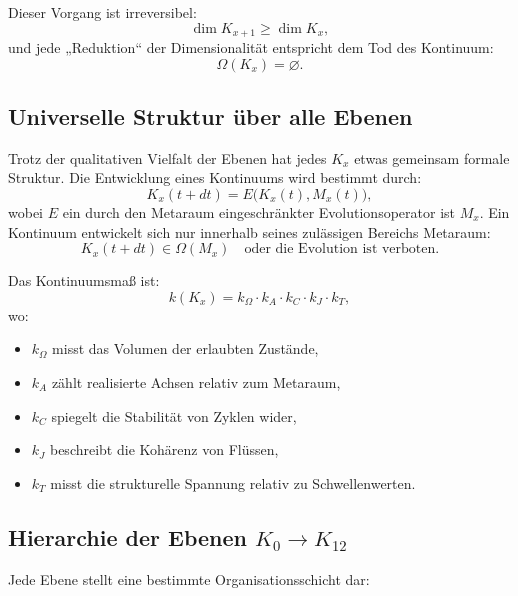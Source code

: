 Dieser Vorgang ist irreversibel:
\[
\dim K_{x+1} \ge \dim K_x,
\]
und jede „Reduktion“ der Dimensionalität entspricht dem Tod des
Kontinuum:
\[
\Omega(K_x) = \varnothing.
\]


\subsection{Universelle Struktur über alle Ebenen}

Trotz der qualitativen Vielfalt der Ebenen hat jedes $K_x$ etwas gemeinsam
formale Struktur.
Die Entwicklung eines Kontinuums wird bestimmt durch:
\[
K_x(t + dt) = E\bigl(K_x(t), M_x(t)\bigr),
\]
wobei $E$ ein durch den Metaraum eingeschränkter Evolutionsoperator ist
$M_x$.
Ein Kontinuum entwickelt sich nur innerhalb seines zulässigen Bereichs
Metaraum:
\[
K_x(t+dt) \in \Omega(M_x)
\quad\text{oder die Evolution ist verboten}.
\]

Das Kontinuumsmaß ist:
\[
k(K_x) =
k_{\Omega} \cdot k_{A} \cdot k_{C} \cdot k_{J} \cdot k_{T},
\]
wo:
\begin{itemize}
    \item $k_{\Omega}$ misst das Volumen der erlaubten Zustände,
    \item $k_{A}$ zählt realisierte Achsen relativ zum Metaraum,
    \item $k_{C}$ spiegelt die Stabilität von Zyklen wider,
    \item $k_{J}$ beschreibt die Kohärenz von Flüssen,
    \item $k_{T}$ misst die strukturelle Spannung relativ zu Schwellenwerten.
\end{itemize}


\subsection{Hierarchie der Ebenen $K_0 \to K_{12}$}

Jede Ebene stellt eine bestimmte Organisationsschicht dar:

